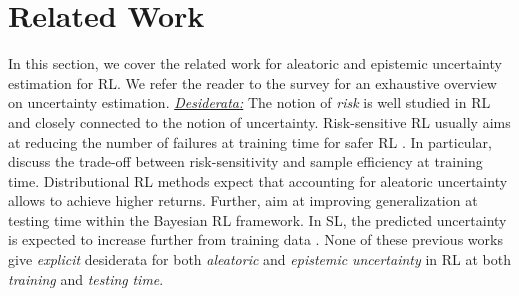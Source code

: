 \vspace{-3mm}
\section{Related Work}
\label{sec:related_work_011}

In this section, we cover the related work for aleatoric and epistemic uncertainty estimation for RL. 
We refer the reader to the survey \cite{review-uncertainty-dl} for an exhaustive overview on uncertainty estimation. 
\underline{\textit{Desiderata:}} The notion of \emph{risk} is well studied in RL and closely connected to the notion of uncertainty. Risk-sensitive RL usually aims at reducing the number of failures at training time for safer RL \cite{risk-sensitive-rl, risk-constrained-rl-percentile, risk-sensitive-mdp, safe-rl-survey}. In particular, \cite{risk-uncertainty-deep-rl, rl-risk-sample-trade-off, epistemic-risk} discuss the trade-off between risk-sensitivity and sample efficiency at training time. Distributional RL methods expect that accounting for aleatoric uncertainty allows to achieve higher returns. Further, \cite{epistemic-pomdp} aim at improving generalization at testing time within the Bayesian RL framework. In SL, the predicted uncertainty is expected to increase further from training data \citep{provable-uncertainty, natpn, bayesian-a-bit, graph-postnet}. None of these previous works give \emph{explicit} desiderata for both \emph{aleatoric} and \emph{epistemic} \emph{uncertainty} in RL at both \emph{training} and \emph{testing} \emph{time}. 
